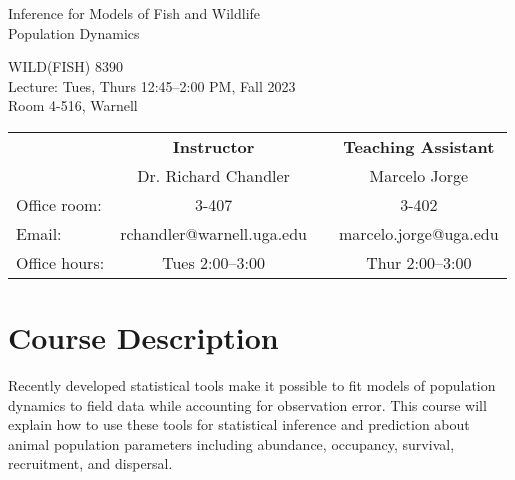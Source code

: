 \documentclass[12pt]{article}
\begin{document}

{\centering

{\Large \sc
  Inference for Models of Fish and Wildlife \\ Population Dynamics  
}
\vspace{6pt}

WILD(FISH) 8390  \\
Lecture: Tues, Thurs 12:45--2:00 PM, Fall 2023 \\
Room 4-516, Warnell \\


\normalsize

\vspace{12pt}

\begin{tabular}[h!]{lccc}
                     & \textbf{Instructor}       & \hspace{0.01cm} & \textbf{Teaching Assistant} \\
                     & Dr. Richard Chandler      &                 & Marcelo Jorge                \\
Office room:         & 3-407                     &                 & 3-402                       \\
Email:               & rchandler@warnell.uga.edu &                 & marcelo.jorge@uga.edu       \\
Office hours:        & Tues 2:00--3:00           &                 & Thur 2:00--3:00             \\
\end{tabular}


}



\normalsize


\vspace{-2mm}
\section*{\normalsize Course Description}
\vspace{-4mm}
Recently developed statistical tools make it possible to fit models of
population dynamics to field data while accounting for observation
error. This course will explain how to use these tools for statistical
inference and prediction about animal population parameters including
abundance, occupancy, survival, recruitment, and dispersal.   
\end{document}

